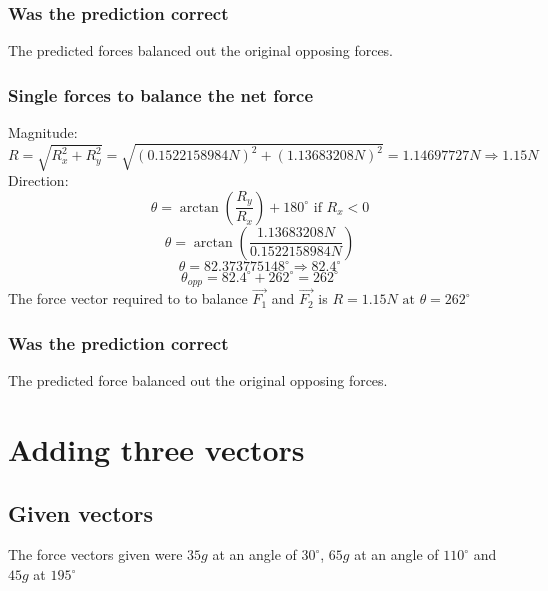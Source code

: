 \documentclass[11pt, letterpaper, includehead]{article}
\begin{document}
\subsubsection{Was the prediction correct} %
The predicted forces balanced out the original opposing forces. 

\subsubsection{Single forces to balance the net force} %
Magnitude:
$$R = \sqrt{R_x^2 + R_y^2} = \sqrt{(0.1522158984N)^2 + (1.13683208N)^2} = 1.14697727N \Rightarrow \boxed{1.15N}$$
Direction:
$$\theta = \arctan \left( \frac{R_y}{R_x} \right) + 180^{\circ} \text{ if } R_x < 0$$
$$\theta = \arctan \left( \frac{1.13683208N}{0.1522158984N} \right)$$
$$\theta = 82.373775148^{\circ} \Rightarrow {82.4^{\circ}}$$
$$\theta_{opp} = 82.4^{\circ} + 262^{\circ} = \boxed{262^{\circ}}$$
The force vector required to to balance $\vec{F_1}$ and $\vec{F_2}$ is
$R = 1.15N \text{ at } \theta = 262^{\circ}$

\subsubsection{Was the prediction correct} %
The predicted force balanced out the original opposing forces. 

\section{Adding three vectors} %

\subsection{Given vectors} %
The force vectors given were $35g$ at an angle of $30^{\circ}$, $65g$ at an angle of $110^{\circ}$ and 
$45g$ at $195^{\circ}$
\end{document}
